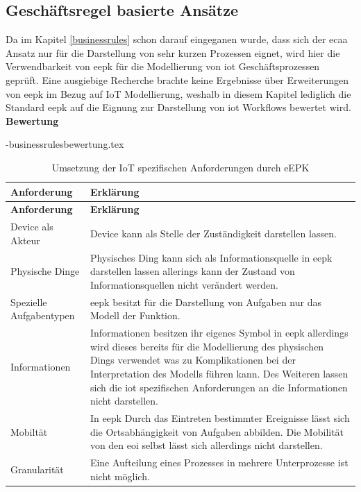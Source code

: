 \documentclass[a4paper, 12pt, twoside, headsepline=true]{scrartcl} %
\begin{document}
\subsection{Geschäftsregel basierte Ansätze}
Da im Kapitel \ref{businessrules} schon darauf eingeganen wurde, dass sich der \ac{ecaa} Ansatz nur für die Darstellung von sehr kurzen Prozessen eignet, wird hier die Verwendbarkeit von \ac{eepk} für die Modellierung von \ac{iot} Geschäftsprozessen geprüft. Eine ausgiebige Recherche brachte keine Ergebnisse über Erweiterungen von \ac{eepk} im Bezug auf IoT Modellierung, weshalb in diesem Kapitel lediglich die Standard \ac{eepk} auf die Eignung zur Darstellung von \ac{iot} Workflows bewertet wird.
\textbf{Bewertung}

\begin{filecontents}{\jobname-businessrulesbewertung.tex}
	\begin{longtable}{P{4cm}|X}
		\caption{Umsetzung der IoT spezifischen Anforderungen durch eEPK}\\
		\label{table:evaluierungskriterien}
		\textbf{Anforderung} & \textbf{Erklärung}   \\ \hline
		\endfirsthead %
		\textbf{Anforderung} & \textbf{Erklärung}  \\ \hline
		\endhead %
		
		Device als Akteur & Device kann als Stelle der Zuständigkeit darstellen lassen. \\ \hline		
		Physische Dinge  & Physisches Ding kann sich als Informationsquelle in \ac{eepk} darstellen lassen allerings kann der Zustand von Informationsquellen nicht verändert werden.\\ \hline	
		Spezielle Aufgabentypen & \ac{eepk} besitzt für die Darstellung von Aufgaben nur das Modell der Funktion.\\ \hline		
		Informationen  & Informationen besitzen ihr eigenes Symbol in \ac{eepk} allerdings wird dieses bereits für die Modellierung des physischen Dings verwendet was zu Komplikationen bei der Interpretation des Modells führen kann. Des Weiteren lassen sich die \ac{iot} spezifischen Anforderungen an die Informationen nicht darstellen.\\ \hline		
		Mobiltät & In \ac{eepk} Durch das Eintreten bestimmter Ereignisse lässt sich die Ortsabhängigkeit von Aufgaben abbilden. Die Mobilität von den \ac{eoi} selbst lässt sich allerdings nicht darstellen.\\ \hline
		Granularität & Eine Aufteilung eines Prozesses in mehrere Unterprozesse ist nicht möglich.\\
	\end{longtable}
\end{filecontents}
\end{document}
